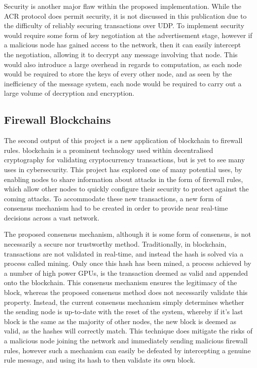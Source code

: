 \documentclass[a4paper, 11pt]{report}
\begin{document}
Security is another major flaw within the proposed implementation. While the ACR protocol does permit security, it is not discussed in this publication due to the difficulty of reliably securing transactions over \acrshort{UDP}. To implement security would require some form of key negotiation at the advertisement stage, however if a malicious node has gained access to the network, then it can easily intercept the negotiation, allowing it to decrypt any message involving that node. This would also introduce a large overhead in regards to computation, as each node would be required to store the keys of every other node, and as seen by the inefficiency of the message system, each node would be required to carry out a large volume of decryption and encryption.

\subsection{Firewall Blockchains}
The second output of this project is a new application of \gls{blockchain} to firewall rules. \Gls{blockchain} is a prominent technology used within decentralised cryptography for validating cryptocurrency transactions, but is yet to see many uses in cybersecurity. This project has explored one of many potential uses, by enabling nodes to share information about attacks in the form of firewall rules, which allow other nodes to quickly configure their security to protect against the coming attacks. To accommodate these new transactions, a new form of consensus mechanism had to be created in order to provide near real-time decisions across a vast network.

The proposed consensus mechanism, although it is some form of consensus, is not necessarily a secure nor trustworthy method. Traditionally, in \gls{blockchain}, transactions are not validated in real-time, and instead the hash is solved via a process called mining. Only once this hash has been mined, a process achieved by a number of high power \acrfull{GPU}s, is the transaction deemed as valid and appended onto the \gls{blockchain}. This consensus mechanism ensures the legitimacy of the block, whereas the proposed consensus method does not necessarily validate this property. Instead, the current consensus mechanism simply determines whether the sending node is up-to-date with the reset of the system, whereby if it's last block is the same as the majority of other nodes, the new block is deemed as valid, as the hashes will correctly match. This technique does mitigate the risks of a malicious node joining the network and immediately sending malicious firewall rules, however such a mechanism can easily be defeated by intercepting a genuine rule message, and using its hash to then validate its own block.
\end{document}
